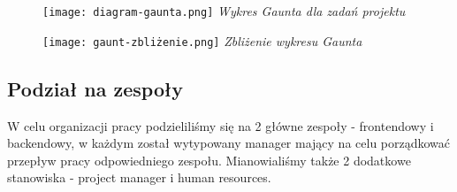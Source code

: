 \documentclass[]{report}
\begin{document}
\begin{figure}[H]
\texttt{[image: diagram-gaunta.png]}
\textit{Wykres Gaunta dla zadań projektu}
\centering
\end{figure}

\begin{figure}[H]
\texttt{[image: gaunt-zbliżenie.png]}
\textit{Zbliżenie wykresu Gaunta}
\centering
\end{figure}

\subsection{Podział na zespoły}

W celu organizacji pracy podzieliliśmy się na 2 główne zespoły - frontendowy i backendowy, w każdym został wytypowany manager mający na celu porządkować przepływ pracy odpowiedniego zespołu. Mianowialiśmy także 2 dodatkowe stanowiska - project manager i human resources.



\vspace{3ex}
\end{document}
